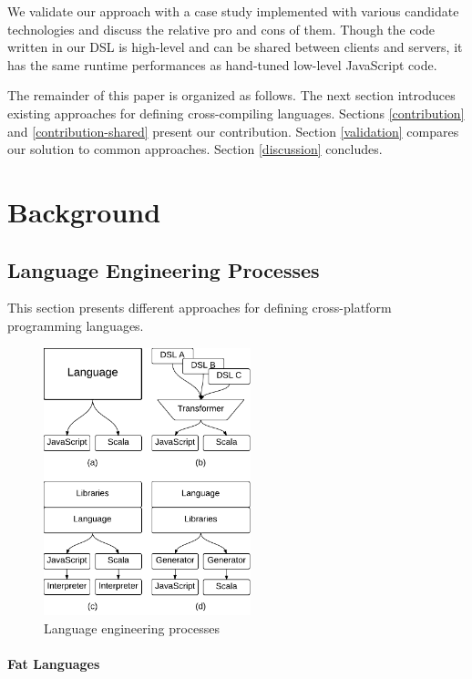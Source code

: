 \documentclass[preprint]{sigplanconf}
\begin{document}
We validate our approach with a case study implemented with various candidate technologies and discuss the relative
pro and cons of them. Though the code written in our DSL is high-level and can be shared between clients and servers,
it has the same runtime performances as hand-tuned low-level JavaScript code.

The remainder of this paper is organized as follows. The next section introduces existing approaches for defining
cross-compiling languages. Sections \ref{contribution} and \ref{contribution-shared} present our contribution.
Section \ref{validation} compares our solution to common approaches. Section \ref{discussion} concludes.

\section{Background}

\subsection{Language Engineering Processes}

This section presents different approaches for defining cross-platform programming languages.

\begin{figure}
\begin{center}
\includegraphics[width=6cm]{langs.pdf}
\end{center}
\caption{Language engineering processes}
\label{langs}
\end{figure}

\paragraph{Fat Languages}
\end{document}
